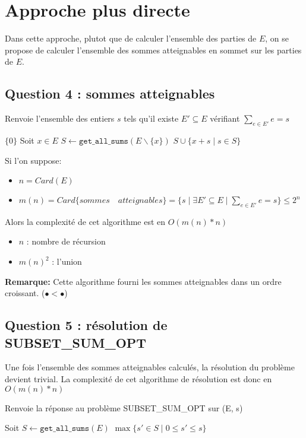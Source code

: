 \documentclass[10pt]{article}
\let\oldReturn\Return
\renewcommand{\Return}{\State\oldReturn}
\begin{document}
	\newpage
	\section{Approche plus directe}\label{approche_plus_directe}
		Dans cette approche, plutot que de calculer l'ensemble des parties de $E$,
		on se propose de calculer l'ensemble des sommes atteignables en sommet sur les parties de $E$.
		
		\subsection{Question 4 : sommes atteignables}\label{get_all_sums}
			\begin{algorithm}
				\caption{Renvoie l'ensemble des entiers $s$ tels qu'il existe $E' \subseteq E$ vérifiant $\sum\limits_{e \in E'}e = s$}
				\begin{algorithmic}[1]
							\Return $\{0\}$
						\EndIf
						\State Soit $x \in E$
						\State $S \leftarrow \mathtt{get\_all\_sums}(E \backslash \{x\})$
						\Return $S \cup \{x + s \mid s \in S\}$
					\EndFunction
				\end{algorithmic}
			\end{algorithm}
			Si l'on suppose:
			\begin{itemize}[label=-]
				\setlength\itemsep{0.1em}
				\item $n = Card(E)$
				\item $m(n) = Card\{sommes \quad atteignables\} = \{s \mid \exists E' \subseteq E \mid \sum\limits_{e \in E'}e = s\} \leq 2^n$
			\end{itemize}
			Alors la complexité de cet algorithme est en $\boxed{O(m(n) * n)}$
			\begin{itemize}[label=-]
				\setlength\itemsep{0.1em}
				\item $n$ : nombre de récursion
				\item $m(n)^2$ : l'union
			\end{itemize}
			\textbf{Remarque:} Cette algorithme fourni les sommes atteignables dans un ordre croissant. ($\bullet < \bullet$)

		\subsection{Question 5 : résolution de SUBSET\_SUM\_OPT}
			Une fois l'ensemble des sommes atteignables calculés, la résolution du problème devient trivial.
			La complexité de cet algorithme de résolution est donc en $\boxed{O(m(n) * n)}$
			\begin{algorithm}
				\caption{Renvoie la réponse au problème SUBSET\_SUM\_OPT sur (E, s)}
				\begin{algorithmic}[1]
					\Function{subset\_sum}{$E \subset \mathbb{N}, s \in \mathbb{N}$}
						\State Soit $S \leftarrow \mathtt{get\_all\_sums}(E)$
						\Return $\max\{s' \in S \mid 0 \leq s' \leq s\}$
					\EndFunction
				\end{algorithmic}
			\end{algorithm}
\end{document}
